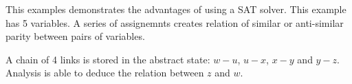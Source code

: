 This examples demonstrates the advantages of using a SAT solver. This
example has 5 variables. A series of assignemnts creates relation of
similar or anti-similar parity between pairs of variables.

A chain of 4 links is stored in the abstract state: $w-u$, $u-x$, $x-y$
and $y-z$. Analysis is able to deduce the relation between $z$ and $w$.
